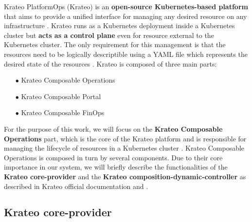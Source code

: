 Krateo PlatformOps (Krateo) is an \textbf{open-source Kubernetes-based platform} that aims to provide a unified interface for managing any desired resource on any infrastructure \cite{krateo_docs}.
Krateo runs as a Kubernetes deployment inside a Kubernetes cluster but \textbf{acts as a control plane} even for resource external to the Kubernetes cluster.
The only requirement for this management is that the resources need to be logically descriptible using a YAML file which represents the desired state of the resources \cite{krateo_docs}.
Krateo is composed of three main parts:
\begin{itemize}[itemsep=0.2pt, topsep=1pt]
    \item[$\bullet$] Krateo Composable Operations
    \item[$\bullet$] Krateo Composable Portal
    \item[$\bullet$] Krateo Composable FinOps
\end{itemize}

For the purpose of this work, we will focus on the \textbf{Krateo Composable Operations} part, which is the core of the Krateo platform and is responsible for managing the lifecycle of resources in a Kubernetes cluster \cite{krateo_docs}.
Krateo Composable Operations is composed in turn by several components. 
Due to their core importance in our system, we will briefly describe the functionalities of the \textbf{Krateo core-provider} and the \textbf{Krateo composition-dynamic-controller} as described in Krateo official documentation \cite{krateo_core_provider} and \cite{krateo_composition_dynamic_controller}.

\subsection{Krateo core-provider}

